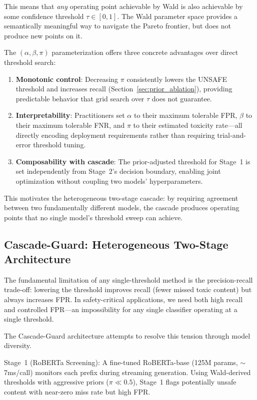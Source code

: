 \documentclass[acmtjournal, acmnowidth]{acmart}
\theoremstyle{definition}
\begin{document}
This means that \textit{any} operating point achievable by Wald is also achievable by some confidence threshold $\tau \in [0,1]$. The Wald parameter space provides a semantically meaningful way to navigate the Pareto frontier, but does not produce new points on it.

The $(\alpha, \beta, \pi)$ parameterization offers three concrete advantages over direct threshold search:
\begin{enumerate}
    \item \textbf{Monotonic control}: Decreasing $\pi$ consistently lowers the UNSAFE threshold and increases recall (Section~\ref{sec:prior_ablation}), providing predictable behavior that grid search over $\tau$ does not guarantee.
    \item \textbf{Interpretability}: Practitioners set $\alpha$ to their maximum tolerable FPR, $\beta$ to their maximum tolerable FNR, and $\pi$ to their estimated toxicity rate---all directly encoding deployment requirements rather than requiring trial-and-error threshold tuning.
    \item \textbf{Composability with cascade}: The prior-adjusted threshold for Stage~1 is set independently from Stage~2's decision boundary, enabling joint optimization without coupling two models' hyperparameters.
\end{enumerate}

This motivates the heterogeneous two-stage cascade: by requiring agreement between two fundamentally different models, the cascade produces operating points that no single model's threshold sweep can achieve.

\subsection{Cascade-Guard: Heterogeneous Two-Stage Architecture}
\label{sec:cascade_method}

The fundamental limitation of any single-threshold method is the precision-recall trade-off: lowering the threshold improves recall (fewer missed toxic content) but always increases FPR. In safety-critical applications, we need both high recall and controlled FPR---an impossibility for any single classifier operating at a single threshold.

The Cascade-Guard architecture attempts to resolve this tension through model diversity.

Stage~1 (RoBERTa Screening): A fine-tuned RoBERTa-base (125M params, ${\sim}$7ms/call) monitors each prefix during streaming generation. Using Wald-derived thresholds with aggressive priors ($\pi \ll 0.5$), Stage~1 flags potentially unsafe content with near-zero miss rate but high FPR.
\end{document}
